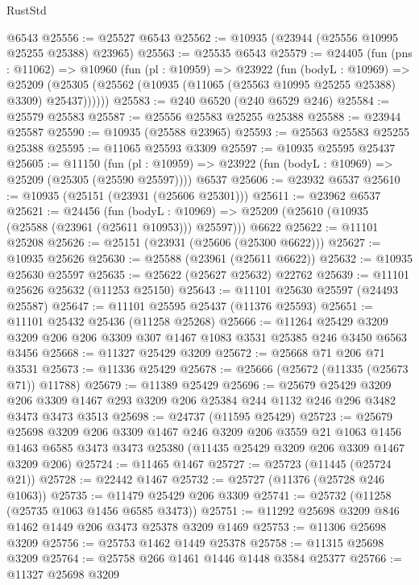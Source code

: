 \begin{lexlean}{RustStd}
\begin{coremodule}
{{{{{{{{{{{{{{{{{{{    @6543
@25556 := @25527 @6543
@25562 := @10935 (@23944 (@25556 @10995 @25255 @25388) @23965)
@25563 := @25535 @6543
@25579 := @24405
    (fun (pns : @11062) =>
    @10960
      (fun (pl : @10959) =>
      @23922
        (fun (bodyL : @10969) =>
        @25209 (@25305 (@25562 (@10935 (@11065 (@25563 @10995 @25255 @25388) @3309) @25437))))))
@25583 := @240 @6520 (@240 @6529 @246)
@25584 := @25579 @25583
@25587 := @25556 @25583 @25255 @25388
@25588 := @23944 @25587
@25590 := @10935 (@25588 @23965)
@25593 := @25563 @25583 @25255 @25388
@25595 := @11065 @25593 @3309
@25597 := @10935 @25595 @25437
@25605 := @11150
    (fun (pl : @10959) => @23922 (fun (bodyL : @10969) => @25209 (@25305 (@25590 @25597))))
    @6537
@25606 := @23932 @6537
@25610 := @10935 (@25151 (@23931 (@25606 @25301)))
@25611 := @23962 @6537
@25621 := @24456
    (fun (bodyL : @10969) => @25209 (@25610 (@10935 (@25588 (@23961 (@25611 @10953))) @25597)))
    @6622
@25622 := @11101 @25208
@25626 := @25151 (@23931 (@25606 (@25300 @6622)))
@25627 := @10935 @25626
@25630 := @25588 (@23961 (@25611 @6622))
@25632 := @10935 @25630 @25597
@25635 := @25622 (@25627 @25632) @22762
@25639 := @11101 @25626 @25632 (@11253 @25150)
@25643 := @11101 @25630 @25597 (@24493 @25587)
@25647 := @11101 @25595 @25437 (@11376 @25593)
@25651 := @11101 @25432 @25436 (@11258 @25268)
@25666 := @11264
    @25429
    @3209
    @3209
    @206
    @206
    @3309
    @307
    @1467
    @1083
    @3531
    @25385
    @246
    @3450
    @6563
    @3456
@25668 := @11327 @25429 @3209
@25672 := @25668 @71 @206 @71 @3531
@25673 := @11336 @25429
@25678 := @25666 (@25672 (@11335 (@25673 @71)) @11788)
@25679 := @11389 @25429
@25696 := @25679
    @25429
    @3209
    @206
    @3309
    @1467
    @293
    @3209
    @206
    @25384
    @244
    @1132
    @246
    @296
    @3482
    @3473
    @3473
    @3513
@25698 := @24737 (@11595 @25429)
@25723 := @25679
    @25698
    @3209
    @206
    @3309
    @1467
    @246
    @3209
    @206
    @3559
    @21
    @1063
    @1456
    @1463
    @6585
    @3473
    @3473
    @25380
    (@11435 @25429 @3209 @206 @3309 @1467 @3209 @206)
@25724 := @11465 @1467
@25727 := @25723 (@11445 (@25724 @21))
@25728 := @22442 @1467
@25732 := @25727 (@11376 (@25728 @246 @1063))
@25735 := @11479 @25429 @206 @3309
@25741 := @25732 (@11258 (@25735 @1063 @1456 @6585 @3473))
@25751 := @11292 @25698 @3209 @846 @1462 @1449 @206 @3473 @25378 @3209 @1469
@25753 := @11306 @25698 @3209
@25756 := @25753 @1462 @1449 @25378
@25758 := @11315 @25698 @3209
@25764 := @25758 @266 @1461 @1446 @1448 @3584 @25377
@25766 := @11327 @25698 @3209
}}}}}}}}}}}}}}}}}}}
\end{coremodule}
\end{lexlean}
